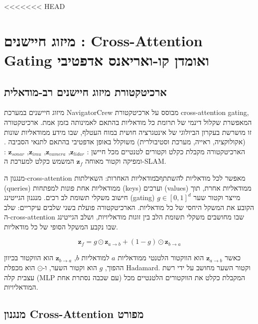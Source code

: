 <<<<<<< HEAD


\section{מיזוג חיישנים : Cross-Attention Gating ואומדן קו-ואריאנס אדפטיבי}
\label{sec:ch05_fusion}

\subsection{ארכיטקטורת מיזוג חיישנים רב-מודאלית}
\label{sec:ch05_architecture}

מיזוג חיישנים במערכת NavigatorCrew מבוסס על ארכיטקטורת cross-attention gating, המאפשרת שקלול דינמי של תרומת כל מודאליות בהתאם לאמינותה בזמן אמת. ארכיטקטורה זו מושרשת בעקרון הביולוגי של אינטגרציה חושית במוח העטלף, שבו מידע ממודאליות שונות (אקולוקציה, ראייה, מערכת וסטיבולרית) משוקלל באופן אדפטיבי בהתאם לתנאי הסביבה \cite{MossEcholocation}. הארכיטקטורה מקבלת כקלט וקטורים לטנטיים מכל חיישן : $\mathbf{z}_{lidar}$, $\mathbf{z}_{camera}$, $\mathbf{z}_{imu}$, $\mathbf{z}_{sonar}$ : ומפיקה וקטור מאוחה $\mathbf{z}_f$ המשמש כקלט למערכת ה-SLAM.

מנגנון ה-cross-attention מאפשר לכל מודאליות \"להשתתף\" במודאליות האחרות: השאילתות (queries) ממודאליות אחת פונות למפתחות (keys) וערכים (values) ממודאליות אחרת, תוך חישוב משקלי תשומת לב רכים. מנגנון הגייטינג (gating) מייצר וקטור שער $g \in [0,1]^d$ הקובע את המשקל היחסי של כל מודאליות. הארכיטקטורה פועלת בשני שלבים עיקריים: שלב ה-cross-attention שבו מחושבים משקלי תשומת הלב בין זוגות מודאליויות, ושלב הגייטינג שבו נקבע המשקל הסופי של כל מודאליות.

\begin{equation}
\mathbf{z}_f = g \odot \mathbf{z}_{a \to b} + (1 - g) \odot \mathbf{z}_{b \to a}
\label{eq:ch05_gating}
\end{equation}

כאשר $\mathbf{z}_{a \to b}$ הוא הווקטור הלטנטי ממודאליות $a$ למודאליות $b$, $\mathbf{z}_{b \to a}$ הוא הווקטור בכיוון ההפוך, $g$ הוא וקטור השער, ו-$\odot$ הוא מכפלת Hadamard. וקטור השער מחושב על ידי רשת עצבית קלה (MLP עם שכבה נסתרת אחת) המקבלת כקלט את הווקטורים הלטנטיים מכל המודאליויות.

\subsection{מנגנון Cross-Attention מפורט}
\label{sec:ch05_cross_attention}

